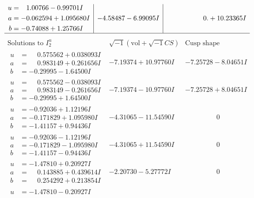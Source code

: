 \documentclass[1p]{elsarticle_modified}
\theoremstyle{definition}
\newcommand{\I}{\sqrt{-1}}
\begin{document}
$$\begin{array}{c|c|c}
\begin{aligned}
u &= \phantom{-}1.00766 - 0.99701 I \\
a &= -0.062594 + 1.095680 I \\
b &= -0.74088 + 1.25766 I\end{aligned}
 & -4.58487 - 6.99095 I & \phantom{-0.000000 -}0. + 10.23365 I\\
 \hline 
 \end{array}$$\newpage$$\begin{array}{c|c|c}  
\text{Solutions to }I^u_{2}& \I (\text{vol} + \sqrt{-1}CS) & \text{Cusp shape}\\
 \hline 
\begin{aligned}
u &= \phantom{-}0.575562 + 0.038093 I \\
a &= \phantom{-}0.983149 + 0.261656 I \\
b &= -0.29995 - 1.64500 I\end{aligned}
 & -7.19374 + 10.97760 I & -7.25728 - 8.04651 I \\ \hline\begin{aligned}
u &= \phantom{-}0.575562 - 0.038093 I \\
a &= \phantom{-}0.983149 - 0.261656 I \\
b &= -0.29995 + 1.64500 I\end{aligned}
 & -7.19374 - 10.97760 I & -7.25728 + 8.04651 I \\ \hline\begin{aligned}
u &= -0.92036 + 1.12196 I \\
a &= -0.171829 + 1.095980 I \\
b &= -1.41157 + 0.94436 I\end{aligned}
 & -4.31065 - 11.54590 I & \phantom{-0.000000 } 0 \\ \hline\begin{aligned}
u &= -0.92036 - 1.12196 I \\
a &= -0.171829 - 1.095980 I \\
b &= -1.41157 - 0.94436 I\end{aligned}
 & -4.31065 + 11.54590 I & \phantom{-0.000000 } 0 \\ \hline\begin{aligned}
u &= -1.47810 + 0.20927 I \\
a &= \phantom{-}0.143885 + 0.439614 I \\
b &= \phantom{-}0.254292 + 0.213854 I\end{aligned}
 & -2.20730 - 5.27772 I & \phantom{-0.000000 } 0 \\ \hline\begin{aligned}
u &= -1.47810 - 0.20927 I \\

\end{aligned}
\end{array}$$
\end{document}
